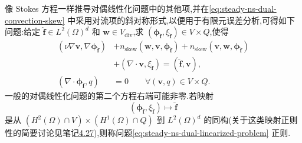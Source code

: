 \begin{note}[对偶线性化问题]
像 Stokes 方程一样推导对偶线性化问题中的其他项,并在\cref{eq:steady-ns-dual-convection-skew} 中采用对流项的斜对称形式,以便用于有限元误差分析,可得如下问题:给定 $\widehat{\bm{f}}\in L^2(\Omega)^d$ 和 $\bm{w}\in V_{\mathrm{div}}$,求 $(\symbf{\phi}_{\widehat{\bm{f}}},\xi_{\widehat{\bm{f}}})\in V\times Q$,使得
\begin{equation}\label{eq:steady-ns-dual-linearized-problem}
\begin{aligned}
  (\nu\nabla\bm{v},\nabla\symbf{\phi}_{\widehat{\bm{f}}})
   &+n_{\mathrm{skew}}(\bm{w},\bm{v},
                        \symbf{\phi}_{\widehat{\bm{f}}})
    +n_{\mathrm{skew}}(\bm{v},\bm{w},
                        \symbf{\phi}_{\widehat{\bm{f}}})\\
   &+(\nabla\cdot\bm{v},\xi_{\widehat{\bm{f}}})
    =(\widehat{\bm{f}},\bm{v}),\\
  (\nabla\cdot\symbf{\phi}_{\widehat{\bm{f}}},q)&=0
       \qquad\forall(\bm{v},q)\in V\times Q.
\end{aligned}
\end{equation}
一般的对偶线性化问题的第二个方程右端可能非零.若映射
\begin{equation}\label{eq:steady-ns-dual-regularity-map}
  (\symbf{\phi}_{\widehat{\bm{f}}},\xi_{\widehat{\bm{f}}})
     \longmapsto\widehat{\bm{f}}
\end{equation}
是从 $(H^2(\Omega)\cap V)\times(H^1(\Omega)\cap Q)$ 到 $L^2(\Omega)^d$ 的同构(关于这类映射正则性的简要讨论见笔记\hyperref[note:stokes-regular-dual-problem]{4.27}),则称问题\cref{eq:steady-ns-dual-linearized-problem} 正则.
\end{note}

